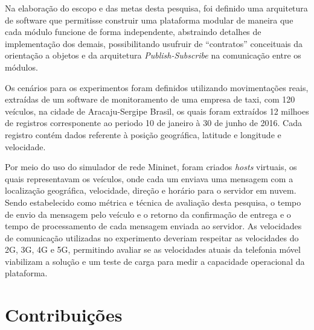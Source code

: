 \documentclass[
	12pt,				%
	oneside,			%
	a4paper,			%
	english,			%
	brazil				%
	]{abntex2ppgsi}
\begin{document}
Na elaboração do escopo e das metas desta pesquisa, foi definido uma arquitetura de software que permitisse construir uma plataforma modular de maneira que cada módulo funcione de forma independente, abstraindo detalhes de implementação dos demais, possibilitando usufruir de ``contratos'' conceituais da orientação a objetos e da arquitetura \textit{Publish-Subscribe} na comunicação entre os módulos.

Os cenários para os experimentos foram definidos utilizando movimentações reais, extraídas de um software de monitoramento de uma empresa de taxi, com 120 veículos, na cidade de Aracaju-Sergipe Brasil, os quais foram extraídos 12 milhoes de registros corresponente ao periodo 10 de janeiro à 30 de junho de 2016. Cada registro contém dados referente à posição geográfica, latitude e longitude e velocidade.

Por meio do uso do simulador de rede Mininet, foram criados \textit{hosts} virtuais, os quais representavam os veículos, onde cada um enviava uma mensagem com a localização geográfica, velocidade, direção e horário para o servidor em nuvem. Sendo estabelecido como métrica e técnica de avaliação desta pesquisa, o tempo de envio da mensagem pelo veículo e o retorno da confirmação de entrega e o tempo de processamento de cada mensagem enviada ao servidor.  As velocidades de comunicação utilizadas no experimento deveriam respeitar as velocidades do 2G, 3G, 4G e 5G, permitindo avaliar se as velocidades atuais da telefonia móvel viabilizam a solução e um teste de carga para medir a capacidade operacional da plataforma.


 
\section{Contribuições}
\end{document}
